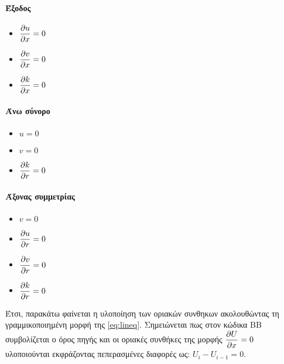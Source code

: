 \paragraph{Έξοδος}

\begin{itemize}
    \item $\dfrac{\partial u}{\partial x}=0$
    \item $\dfrac{\partial v}{\partial x}=0$
    \item $\dfrac{\partial k}{\partial x}=0$
\end{itemize}

\paragraph{Άνω σύνορο}

\begin{itemize}
    \item $u=0$
    \item $v=0$
    \item $\dfrac{\partial k}{\partial r}=0$
\end{itemize}

\paragraph{Άξονας συμμετρίας}

\begin{itemize}
    \item $v=0$
    \item $\dfrac{\partial u}{\partial r}=0$
    \item $\dfrac{\partial v}{\partial r}=0$
    \item $\dfrac{\partial k}{\partial r}=0$
\end{itemize}

Έτσι, παρακάτω φαίνεται η υλοποίηση των οριακών συνθηκων ακολουθώντας τη γραμμικοποιημένη μορφή της \ref{eq:lineq}. Σημειώνεται πως στον κώδικα BB συμβολίζεται ο όρος πηγής και οι οριακές συνθήκες της μορφής $\dfrac{\partial U}{\partial x}=0$ υλοποιούνται εκφράζοντας πεπερασμένες διαφορές ως: $U_i-U_{i-1}=0$.

